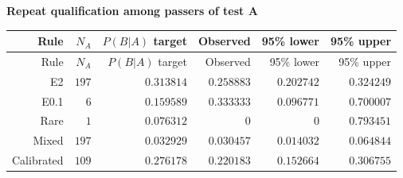 
\begingroup\small
\setlength{\tabcolsep}{4pt}
\noindent\textbf{Repeat qualification among passers of test A}
\begin{longtable}{rrrrrr}
\toprule
Rule & $N_A$ & $P(B|A)$ target & Observed & 95\% lower & 95\% upper \\
\midrule
\endfirsthead
Rule & $N_A$ & $P(B|A)$ target & Observed & 95\% lower & 95\% upper \\
\midrule
\endhead
\bottomrule
\endfoot
E2 & $197$ & $0.313814$ & $0.258883$ & $0.202742$ & $0.324249$ \\
E0.1 & $6$ & $0.159589$ & $0.333333$ & $0.096771$ & $0.700007$ \\
Rare & $1$ & $0.076312$ & $0$ & $0$ & $0.793451$ \\
Mixed & $197$ & $0.032929$ & $0.030457$ & $0.014032$ & $0.064844$ \\
Calibrated & $109$ & $0.276178$ & $0.220183$ & $0.152664$ & $0.306755$ \\
\end{longtable}
\endgroup

